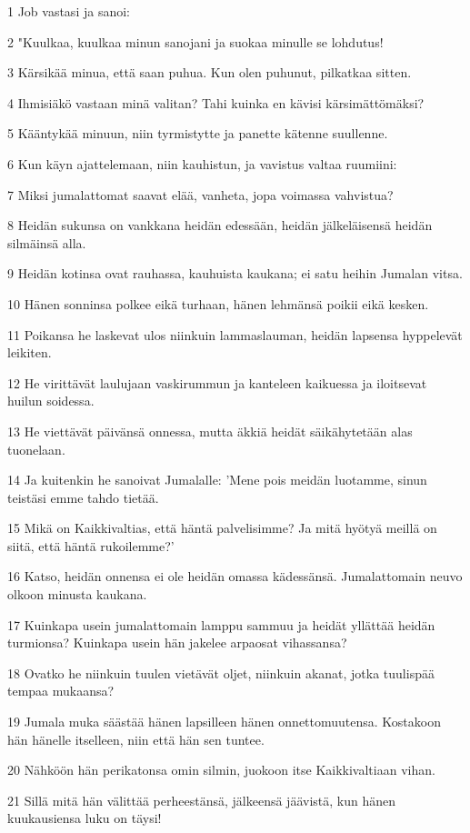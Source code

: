 \par 1 Job vastasi ja sanoi:
\par 2 "Kuulkaa, kuulkaa minun sanojani ja suokaa minulle se lohdutus!
\par 3 Kärsikää minua, että saan puhua. Kun olen puhunut, pilkatkaa sitten.
\par 4 Ihmisiäkö vastaan minä valitan? Tahi kuinka en kävisi kärsimättömäksi?
\par 5 Kääntykää minuun, niin tyrmistytte ja panette kätenne suullenne.
\par 6 Kun käyn ajattelemaan, niin kauhistun, ja vavistus valtaa ruumiini:
\par 7 Miksi jumalattomat saavat elää, vanheta, jopa voimassa vahvistua?
\par 8 Heidän sukunsa on vankkana heidän edessään, heidän jälkeläisensä heidän silmäinsä alla.
\par 9 Heidän kotinsa ovat rauhassa, kauhuista kaukana; ei satu heihin Jumalan vitsa.
\par 10 Hänen sonninsa polkee eikä turhaan, hänen lehmänsä poikii eikä kesken.
\par 11 Poikansa he laskevat ulos niinkuin lammaslauman, heidän lapsensa hyppelevät leikiten.
\par 12 He virittävät laulujaan vaskirummun ja kanteleen kaikuessa ja iloitsevat huilun soidessa.
\par 13 He viettävät päivänsä onnessa, mutta äkkiä heidät säikähytetään alas tuonelaan.
\par 14 Ja kuitenkin he sanoivat Jumalalle: 'Mene pois meidän luotamme, sinun teistäsi emme tahdo tietää.
\par 15 Mikä on Kaikkivaltias, että häntä palvelisimme? Ja mitä hyötyä meillä on siitä, että häntä rukoilemme?'
\par 16 Katso, heidän onnensa ei ole heidän omassa kädessänsä. Jumalattomain neuvo olkoon minusta kaukana.
\par 17 Kuinkapa usein jumalattomain lamppu sammuu ja heidät yllättää heidän turmionsa? Kuinkapa usein hän jakelee arpaosat vihassansa?
\par 18 Ovatko he niinkuin tuulen vietävät oljet, niinkuin akanat, jotka tuulispää tempaa mukaansa?
\par 19 Jumala muka säästää hänen lapsilleen hänen onnettomuutensa. Kostakoon hän hänelle itselleen, niin että hän sen tuntee.
\par 20 Nähköön hän perikatonsa omin silmin, juokoon itse Kaikkivaltiaan vihan.
\par 21 Sillä mitä hän välittää perheestänsä, jälkeensä jäävistä, kun hänen kuukausiensa luku on täysi!
